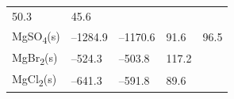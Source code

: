 \documentclass[
]{book}
\theoremstyle{definition}
\theoremstyle{definition}
\theoremstyle{definition}
\theoremstyle{remark}
\begin{document}
\begin{longtable}[]{@{}lllll@{}}
\begin{minipage}[t]{0.18\columnwidth}
50.3\strut
\end{minipage} & \begin{minipage}[t]{0.18\columnwidth}\raggedright
45.6\strut
\end{minipage}\tabularnewline
\begin{minipage}[t]{0.10\columnwidth}\raggedright
MgSO\textsubscript{4}(s)\strut
\end{minipage} & \begin{minipage}[t]{0.19\columnwidth}\raggedright
--1284.9\strut
\end{minipage} & \begin{minipage}[t]{0.20\columnwidth}\raggedright
--1170.6\strut
\end{minipage} & \begin{minipage}[t]{0.18\columnwidth}\raggedright
91.6\strut
\end{minipage} & \begin{minipage}[t]{0.18\columnwidth}\raggedright
96.5\strut
\end{minipage}\tabularnewline
\begin{minipage}[t]{0.10\columnwidth}\raggedright
MgBr\textsubscript{2}(s)\strut
\end{minipage} & \begin{minipage}[t]{0.19\columnwidth}\raggedright
--524.3\strut
\end{minipage} & \begin{minipage}[t]{0.20\columnwidth}\raggedright
--503.8\strut
\end{minipage} & \begin{minipage}[t]{0.18\columnwidth}\raggedright
117.2\strut
\end{minipage} & \begin{minipage}[t]{0.18\columnwidth}\raggedright
\strut
\end{minipage}\tabularnewline
\begin{minipage}[t]{0.10\columnwidth}\raggedright
MgCl\textsubscript{2}(s)\strut
\end{minipage} & \begin{minipage}[t]{0.19\columnwidth}\raggedright
--641.3\strut
\end{minipage} & \begin{minipage}[t]{0.20\columnwidth}\raggedright
--591.8\strut
\end{minipage} & \begin{minipage}[t]{0.18\columnwidth}\raggedright
89.6\strut
\end{minipage} & \begin{minipage}[t]{0.18\columnwidth}\raggedright

\end{minipage}
\end{longtable}
\end{document}
